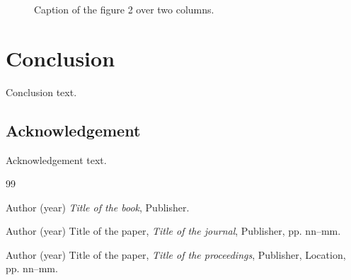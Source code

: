 \documentclass[11pt,twoside]{article}
\begin{document}
\begin{figure}[b] %
  \begin{center}
  \end{center}
  \caption{Caption of the figure 2 over two columns.}
\end{figure}

\section{Conclusion} %
Conclusion text.

\subsection*{Acknowledgement}
Acknowledgement text.

\begin{thebibliography}{99}

  \bibitem{} Author (year) {\it Title of the book}, Publisher.

  \bibitem{} Author (year) Title of the paper, {\it Title of the journal}, Publisher, pp. nn--mm.

  \bibitem{} Author (year) Title of the paper, {\it Title of the proceedings}, Publisher, Location, pp. nn--mm.

\end{thebibliography}
\end{document}
